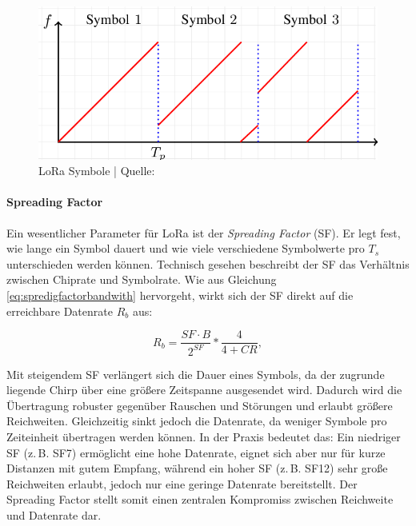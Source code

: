 \begin{figure}[H]
\centering
\includegraphics[scale=.4]{figures/asstes/n-LoRa-CSS-each-symbol-is-encoded-as-a-single-circularly-shifted-chirp-and-covers-the.png}
\caption{LoRa Symbole | Quelle: \cite{inproceedings}}
\label{fig:lora-symbole}
\end{figure}

\paragraph*{Spreading Factor}  
Ein wesentlicher Parameter für LoRa ist der \textit{Spreading Factor} (SF). Er legt fest, wie lange ein Symbol dauert und wie viele verschiedene Symbolwerte pro $T_s$ unterschieden werden können. Technisch gesehen beschreibt der SF das Verhältnis zwischen Chiprate und Symbolrate. Wie aus Gleichung \ref{eq:spredigfactorbandwith} \cite[S.6]{rhode&schwarzCharacterizationLoRaDevices} hervorgeht, wirkt sich der SF direkt auf die erreichbare Datenrate $R_b$ aus:  

\begin{equation}
\label{eq:spredigfactorbandwith}
R_b = \frac{SF \cdot B}{2^{SF}} * \frac{4}{4 + CR},
\end{equation}

Mit steigendem SF verlängert sich die Dauer eines Symbols, da der zugrunde liegende Chirp über eine größere Zeitspanne ausgesendet wird. Dadurch wird die Übertragung robuster gegenüber Rauschen und Störungen und erlaubt größere Reichweiten. Gleichzeitig sinkt jedoch die Datenrate, da weniger Symbole pro Zeiteinheit übertragen werden können. In der Praxis bedeutet das: Ein niedriger SF (z.\,B. SF7) ermöglicht eine hohe Datenrate, eignet sich aber nur für kurze Distanzen mit gutem Empfang, während ein hoher SF (z.\,B. SF12) sehr große Reichweiten erlaubt, jedoch nur eine geringe Datenrate bereitstellt. Der Spreading Factor stellt somit einen zentralen Kompromiss zwischen Reichweite und Datenrate dar.  


